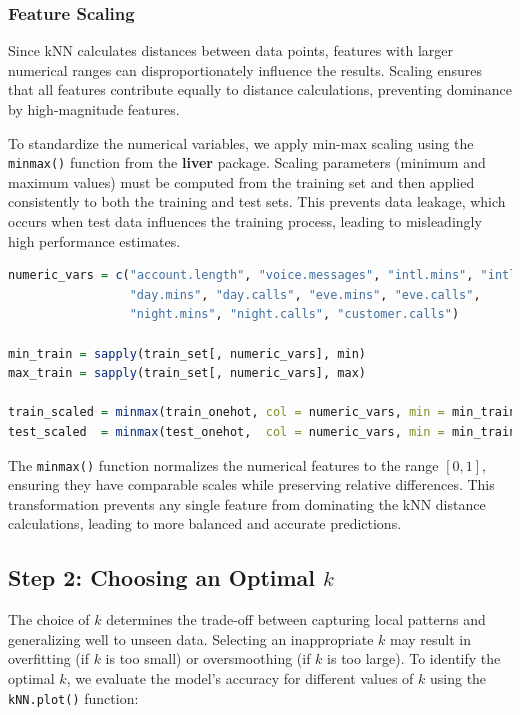 \documentclass[
]{book}
\newcommand{\passthrough}[1]{#1}
\theoremstyle{definition}
\theoremstyle{definition}
\theoremstyle{definition}
\theoremstyle{definition}
\theoremstyle{remark}
\begin{document}
\subsubsection*{Feature Scaling}\label{feature-scaling-2}

Since kNN calculates distances between data points, features with larger numerical ranges can disproportionately influence the results. Scaling ensures that all features contribute equally to distance calculations, preventing dominance by high-magnitude features.

To standardize the numerical variables, we apply min-max scaling using the \passthrough{\lstinline!minmax()!} function from the \textbf{liver} package. Scaling parameters (minimum and maximum values) must be computed from the training set and then applied consistently to both the training and test sets. This prevents data leakage, which occurs when test data influences the training process, leading to misleadingly high performance estimates.

\begin{lstlisting}[language=R]
numeric_vars = c("account.length", "voice.messages", "intl.mins", "intl.calls", 
                 "day.mins", "day.calls", "eve.mins", "eve.calls", 
                 "night.mins", "night.calls", "customer.calls")

min_train = sapply(train_set[, numeric_vars], min)
max_train = sapply(train_set[, numeric_vars], max)

train_scaled = minmax(train_onehot, col = numeric_vars, min = min_train, max = max_train)
test_scaled  = minmax(test_onehot,  col = numeric_vars, min = min_train, max = max_train)
\end{lstlisting}

The \passthrough{\lstinline!minmax()!} function normalizes the numerical features to the range \([0, 1]\), ensuring they have comparable scales while preserving relative differences. This transformation prevents any single feature from dominating the kNN distance calculations, leading to more balanced and accurate predictions.

\subsection{\texorpdfstring{Step 2: Choosing an Optimal \(k\)}{Step 2: Choosing an Optimal k}}\label{step-2-choosing-an-optimal-k}

The choice of \(k\) determines the trade-off between capturing local patterns and generalizing well to unseen data. Selecting an inappropriate \(k\) may result in overfitting (if \(k\) is too small) or oversmoothing (if \(k\) is too large). To identify the optimal \(k\), we evaluate the model's accuracy for different values of \(k\) using the \passthrough{\lstinline!kNN.plot()!} function:
\end{document}
